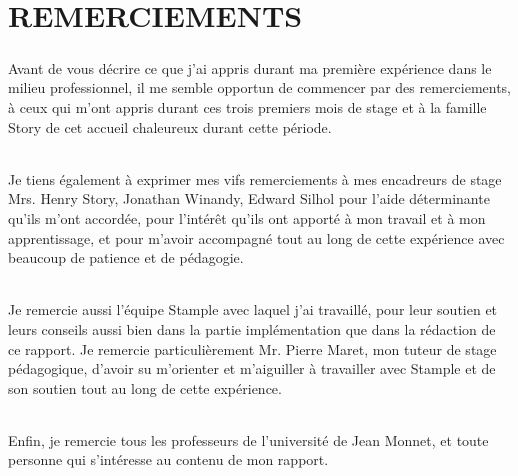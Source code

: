 \chapter{REMERCIEMENTS}
\paragraph{}
Avant de vous décrire ce que j'ai appris durant ma première expérience dans le milieu 
professionnel, il me semble opportun de commencer par des remerciements, à ceux qui m'ont 
appris durant ces trois premiers mois de stage et à la famille Story de cet accueil chaleureux 
durant cette période.
\subparagraph{}
Je tiens également à exprimer mes vifs remerciements à mes encadreurs de stage Mrs. Henry 
Story, Jonathan Winandy, Edward Silhol pour l'aide déterminante qu'ils m’ont accordée, pour l'intérêt qu'ils ont apporté à mon travail et 
à mon apprentissage, et pour m’avoir accompagné tout au long de cette expérience avec 
beaucoup de patience et de pédagogie.
\subparagraph{}
Je remercie aussi l'équipe Stample avec 
laquel j'ai travaillé, pour leur soutien et leurs conseils aussi bien dans la partie 
implémentation que dans la rédaction de ce rapport.
Je remercie particulièrement Mr. Pierre Maret, mon tuteur de stage pédagogique, d'avoir su 
m'orienter et m'aiguiller à travailler avec Stample et de son soutien tout au long de cette 
expérience.
\subparagraph{}
Enfin, je remercie tous les professeurs de l'université de Jean Monnet, et toute personne qui 
s'intéresse au contenu de mon rapport.